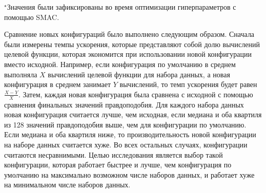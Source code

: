 \begin{table}[ht]
    \caption{Значения гиперпараметров генетического алгоритма после каждой попытки оптимизации с помощью SMAC}
    \centering
    \begin{tablenotes}
      \footnotesize
      \item $^\star$Значения были зафиксированы во время оптимизации гиперпараметров с помощью SMAC.
    \end{tablenotes}
    \label{tab:smac_results}
\end{table}

Сравнение новых конфигураций было выполнено следующим образом.
Сначала были измерены темпы ускорения, которые представляют собой долю вычислений целевой функции, которая экономится при использовании новой конфигурации вместо исходной.
Например, если конфигурация по умолчанию в среднем выполняла $X$ вычислений целевой функции для набора данных, а новая конфигурация в среднем занимает $Y$ вычислений, то темп ускорения будет равен $\frac{X-Y}{X}$.
Затем, каждая новая конфигурация была сравнена с исходной с помощью сравнения финальных значений правдоподобия.
Для каждого набора данных новая конфигурация считается лучше, чем исходная, если медиана и оба квартиля из 128 значений правдоподобия выше, чем для конфигурации по умолчанию.
Если медиана и оба квартиля ниже, то производительность новой конфигурации на наборе данных считается хуже.
Во всех остальных случаях, конфигурации считаются несравнимыми.
Целью исследования является выбор такой конфигурации, которая работает быстрее и лучше, чем конфигурация по умолчанию на максимально возможном числе наборов данных, и работает хуже на минимальном числе наборов данных.

